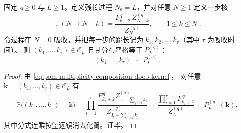 \begin{algorithm}\label{alg:pom-multiplicity-composition-doob-update-sampler}
固定 \(q\ge 0\) 与 \(L\ge 1\)。定义残长过程 \(N_0=L\)，并对任意 \(N\ge 1\) 定义一步核
\begin{equation}\label{eq:pom-multiplicity-composition-doob-kernel}
\boxed{\;
\mathbb{P}(N\to N-k)=\frac{F_{k+2}^{\,q}\,Z_{N-k}^{(q)}}{Z_N^{(q)}},
\qquad 1\le k\le N\; }.
\end{equation}
令过程在 \(N=0\) 吸收，并把每一步的跳长记为 \(k_1,k_2,\dots,k_{\tau}\)（其中 \(\tau\) 为吸收时间）。
则 \((k_1,\dots,k_\tau)\in\mathcal{C}_L\) 且其分布严格等于 \(P_L^{(q)}\)：
\[
(k_1,\dots,k_\tau)\ \sim\ P_L^{(q)}.
\]
\end{algorithm}
\begin{proof}
由 \eqref{eq:pom-multiplicity-composition-doob-kernel}，
对任意 \(\boldsymbol{k}=(k_1,\dots,k_r)\in\mathcal{C}_L\) 有
\[
\mathbb{P}\bigl((k_1,\dots,k_\tau)=\boldsymbol{k}\bigr)
=\prod_{i=1}^{r}\frac{F_{k_i+2}^{\,q}Z_{L-\sum_{j\le i}k_j}^{(q)}}{Z_{L-\sum_{j<i}k_j}^{(q)}}
=\frac{\prod_{i=1}^{r}F_{k_i+2}^{\,q}}{Z_L^{(q)}}
=P_L^{(q)}(\boldsymbol{k}),
\]
其中分式连乘按望远镜消去化简。证毕。
\end{proof}

